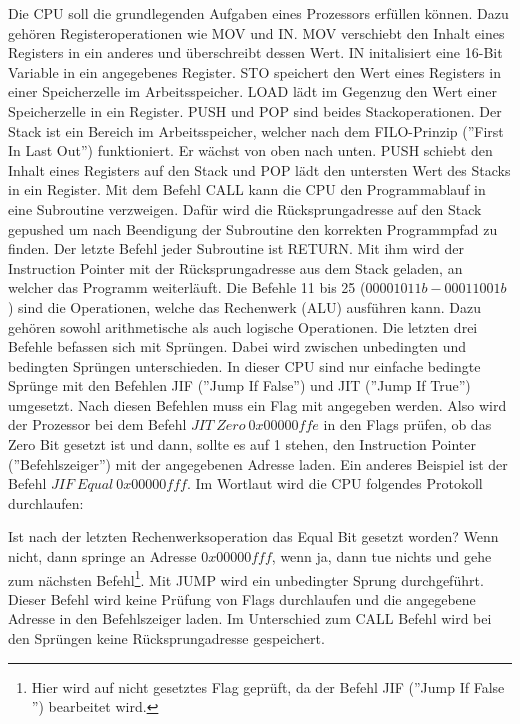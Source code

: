 \documentclass[a4paper,12pt]{article}
\begin{document}
\newpage
\noindent Die CPU soll die grundlegenden Aufgaben eines Prozessors erfüllen können. Dazu gehören Registeroperationen wie MOV und IN. MOV verschiebt den Inhalt eines Registers in ein anderes und überschreibt dessen Wert. IN initalisiert eine 16-Bit Variable in ein angegebenes Register. STO speichert den Wert eines Registers in einer Speicherzelle im Arbeitsspeicher. LOAD lädt im Gegenzug den Wert einer Speicherzelle in ein Register. PUSH und POP sind beides Stackoperationen. Der Stack ist ein Bereich im Arbeitsspeicher, welcher nach dem FILO-Prinzip (''First In Last Out'') funktioniert. Er wächst von oben nach unten. PUSH schiebt den Inhalt eines Registers auf den Stack und POP lädt den untersten Wert des Stacks in ein Register. Mit dem Befehl CALL kann die CPU den Programmablauf in eine Subroutine verzweigen. Dafür wird die Rücksprungadresse auf den Stack gepushed um nach Beendigung der Subroutine den korrekten Programmpfad zu finden. Der letzte Befehl jeder Subroutine ist RETURN. Mit ihm wird der Instruction Pointer mit der Rücksprungadresse aus dem Stack geladen, an welcher das Programm weiterläuft. Die Befehle 11 bis 25 ($00001011b - 00011001b$) sind die Operationen, welche das Rechenwerk (ALU) ausführen kann. Dazu gehören sowohl arithmetische als auch logische Operationen. Die letzten drei Befehle befassen sich mit Sprüngen. Dabei wird zwischen unbedingten und bedingten Sprüngen unterschieden. In dieser CPU sind nur einfache bedingte Sprünge mit den Befehlen JIF (''Jump If False'') und JIT (''Jump If True'') umgesetzt. Nach diesen Befehlen muss ein Flag mit angegeben werden. Also wird der Prozessor bei dem Befehl $JIT \ Zero \ 0x00000ffe$  in den Flags prüfen, ob das Zero Bit gesetzt ist und dann, sollte es auf 1 stehen, den Instruction Pointer (''Befehlszeiger'') mit der angegebenen Adresse laden. Ein anderes Beispiel ist der Befehl $JIF \ Equal \ 0x00000fff$. Im Wortlaut wird die CPU folgendes Protokoll durchlaufen:\par\smallskip\noindent Ist nach der letzten Rechenwerksoperation das Equal Bit gesetzt worden? Wenn nicht, dann springe an Adresse $0x00000fff$, wenn ja, dann tue nichts und gehe zum nächsten Befehl\footnote{Hier wird auf nicht gesetztes Flag geprüft, da der Befehl JIF (''Jump If False '') bearbeitet wird.}. Mit JUMP wird ein unbedingter Sprung durchgeführt. Dieser Befehl wird keine Prüfung von Flags durchlaufen und die angegebene Adresse in den Befehlszeiger laden. Im Unterschied zum CALL Befehl wird bei den Sprüngen keine Rücksprungadresse gespeichert.
\end{document}
